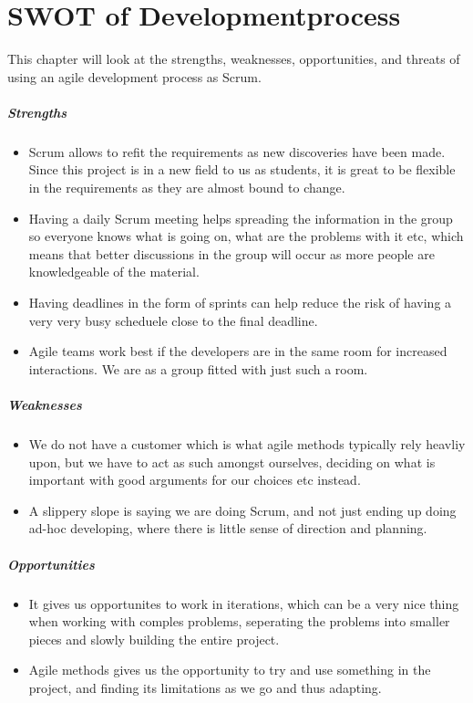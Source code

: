 \chapter{SWOT of Developmentprocess}
This chapter will look at the strengths, weaknesses, opportunities, and threats of using an agile development process as Scrum.
\vspace{-15pt}
\paragraph{Strengths}
\begin{itemize}
        \item Scrum allows to refit the requirements as new discoveries have been made. Since this project is in a new field to us as students, it is great to be flexible in the requirements as they are almost bound to change.
        \item Having a daily Scrum meeting helps spreading the information in the group so everyone knows what is going on, what are the problems with it etc, which means that better discussions in the group will occur as more people are knowledgeable of the material.
        \item Having deadlines in the form of sprints can help reduce the risk of having a very very busy scheduele close to the final deadline.
        \item Agile teams work best if the developers are in the same room for increased interactions. We are as a group fitted with just such a room.
\end{itemize}
\vspace{-15pt}
\paragraph{Weaknesses} 
\begin{itemize}
        \item We do not have a customer which is what agile methods typically rely heavliy upon, but we have to act as such amongst ourselves, deciding on what is important with good arguments for our choices etc instead.
        \item A slippery slope is saying we are doing Scrum, and not just ending up doing ad-hoc developing, where there is little sense of direction and planning.
\end{itemize} 
\vspace{-15pt}
\paragraph{Opportunities} 
\begin{itemize}
        \item It gives us opportunites to work in iterations, which can be a very nice thing when working with comples problems, seperating the problems into smaller pieces and slowly building the entire project.
        \item Agile methods gives us the opportunity to try and use something in the project, and finding its limitations as we go and thus adapting.
\end{itemize} 
\vspace{-15pt}
